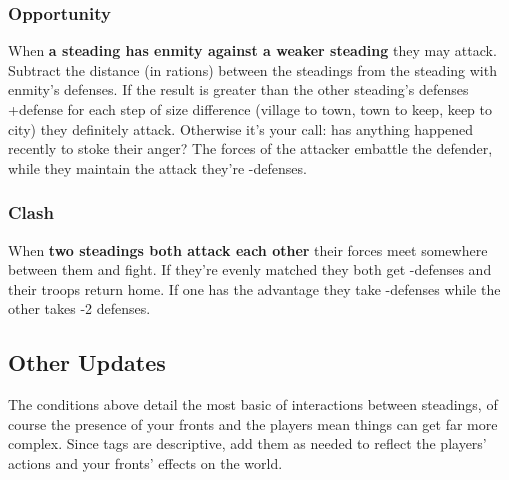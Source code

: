 \subsubsection{Opportunity}


 When \textbf{a steading has enmity against a weaker steading}
 they may attack. Subtract the distance (in rations) between the steadings from the steading with enmity's defenses. If the result is greater than the other steading's defenses +defense for each step of size difference (village to town, town to keep, keep to city) they definitely attack. Otherwise it's your call: has anything happened recently to stoke their anger? The forces of the attacker embattle the defender, while they maintain the attack they're -defenses.
\subsubsection{Clash}


 When \textbf{two steadings both attack each other}
 their forces meet somewhere between them and fight. If they're evenly matched they both get -defenses and their troops return home. If one has the advantage they take -defenses while the other takes -2 defenses.
\subsection{Other Updates}


 The conditions above detail the most basic of interactions between steadings, of course the presence of your fronts and the players mean things can get far more complex. Since tags are descriptive, add them as needed to reflect the players' actions and your fronts' effects on the world.


